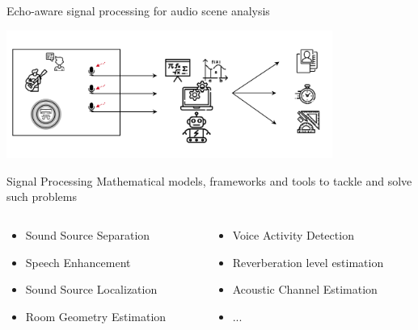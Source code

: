 \begin{frame}[t]{Echo-aware \alert{signal processing} for audio scene analysis}

    \begin{center}
        \includegraphics[trim={0 35mm 0 35mm},clip,width=0.8\textwidth]{figures/scene_analysis.png}
    \end{center}

    \pause
    \begin{mydefblock}{Signal Processing}
        Mathematical models, frameworks and tools to tackle and solve such problems
    \end{mydefblock}

    \pause
    \begin{columns}[T,onlytextwidth]
        \begin{column}{0.48\textwidth}
            \footnotesize
            \begin{itemize}
                \item Sound Source Separation
                \item Speech Enhancement
                \item Sound Source Localization
                \item Room Geometry Estimation
            \end{itemize}
        \end{column}

        \begin{column}{0.48\textwidth}
            \begin{itemize}\footnotesize
                \item Voice Activity Detection
                \item Reverberation level estimation
                \item Acoustic Channel Estimation
                \item ...
            \end{itemize}


\end{column}
\end{columns}
\end{frame}
